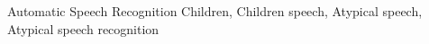 \acresetall
\noindent Automatic Speech Recognition Children, Children speech, Atypical speech, Atypical speech recognition
